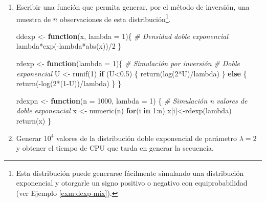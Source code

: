 \documentclass[
]{book}
\newenvironment{Shaded}{\begin{snugshade}}{\end{snugshade}}
\newcommand{\AttributeTok}[1]{\textcolor[rgb]{0.77,0.63,0.00}{#1}}
\newcommand{\CommentTok}[1]{\textcolor[rgb]{0.56,0.35,0.01}{\textit{#1}}}
\newcommand{\ControlFlowTok}[1]{\textcolor[rgb]{0.13,0.29,0.53}{\textbf{#1}}}
\newcommand{\DecValTok}[1]{\textcolor[rgb]{0.00,0.00,0.81}{#1}}
\newcommand{\FloatTok}[1]{\textcolor[rgb]{0.00,0.00,0.81}{#1}}
\newcommand{\FunctionTok}[1]{\textcolor[rgb]{0.00,0.00,0.00}{#1}}
\newcommand{\NormalTok}[1]{#1}
\newcommand{\OtherTok}[1]{\textcolor[rgb]{0.56,0.35,0.01}{#1}}
\newcommand{\SpecialCharTok}[1]{\textcolor[rgb]{0.00,0.00,0.00}{#1}}
\theoremstyle{break}
\theoremstyle{definition}
\theoremstyle{definition}
\theoremstyle{definition}
\theoremstyle{definition}
\theoremstyle{remark}
\begin{document}
\begin{enumerate}
\def\labelenumi{\alph{enumi})}
\item
  Escribir una función que permita generar, por el método de
  inversión, una muestra de \(n\) observaciones de esta distribución\footnote{Esta distribución puede generarse fácilmente simulando una distribución exponencial y otorgarle un signo positivo o negativo con equiprobabilidad (ver Ejemplo \ref{exm:dexp-mix}).}.

\begin{Shaded}
\begin{Highlighting}[]
\NormalTok{ddexp }\OtherTok{\textless{}{-}} \ControlFlowTok{function}\NormalTok{(x, }\AttributeTok{lambda =} \DecValTok{1}\NormalTok{)\{}
\CommentTok{\# Densidad doble exponencial}
\NormalTok{  lambda}\SpecialCharTok{*}\FunctionTok{exp}\NormalTok{(}\SpecialCharTok{{-}}\NormalTok{lambda}\SpecialCharTok{*}\FunctionTok{abs}\NormalTok{(x))}\SpecialCharTok{/}\DecValTok{2}
\NormalTok{\}}

\NormalTok{rdexp }\OtherTok{\textless{}{-}} \ControlFlowTok{function}\NormalTok{(}\AttributeTok{lambda =} \DecValTok{1}\NormalTok{)\{}
\CommentTok{\# Simulación por inversión}
\CommentTok{\# Doble exponencial}
\NormalTok{  U }\OtherTok{\textless{}{-}} \FunctionTok{runif}\NormalTok{(}\DecValTok{1}\NormalTok{)}
  \ControlFlowTok{if}\NormalTok{ (U}\SpecialCharTok{\textless{}}\FloatTok{0.5}\NormalTok{) \{}
    \FunctionTok{return}\NormalTok{(}\FunctionTok{log}\NormalTok{(}\DecValTok{2}\SpecialCharTok{*}\NormalTok{U)}\SpecialCharTok{/}\NormalTok{lambda)}
\NormalTok{  \} }\ControlFlowTok{else}\NormalTok{ \{}
    \FunctionTok{return}\NormalTok{(}\SpecialCharTok{{-}}\FunctionTok{log}\NormalTok{(}\DecValTok{2}\SpecialCharTok{*}\NormalTok{(}\DecValTok{1}\SpecialCharTok{{-}}\NormalTok{U))}\SpecialCharTok{/}\NormalTok{lambda)}
\NormalTok{  \}}
\NormalTok{\}}

\NormalTok{rdexpn }\OtherTok{\textless{}{-}} \ControlFlowTok{function}\NormalTok{(}\AttributeTok{n =} \DecValTok{1000}\NormalTok{, }\AttributeTok{lambda =} \DecValTok{1}\NormalTok{) \{}
\CommentTok{\# Simulación n valores de doble exponencial}
\NormalTok{    x }\OtherTok{\textless{}{-}} \FunctionTok{numeric}\NormalTok{(n)}
    \ControlFlowTok{for}\NormalTok{(i }\ControlFlowTok{in} \DecValTok{1}\SpecialCharTok{:}\NormalTok{n) x[i]}\OtherTok{\textless{}{-}}\FunctionTok{rdexp}\NormalTok{(lambda)}
    \FunctionTok{return}\NormalTok{(x)}
\NormalTok{\}}
\end{Highlighting}
\end{Shaded}
\item
  Generar \(10^{4}\) valores de la distribución doble exponencial de
  parámetro \(\lambda=2\) y obtener el tiempo de CPU que tarda en
  generar la secuencia.


\end{enumerate}
\end{document}
